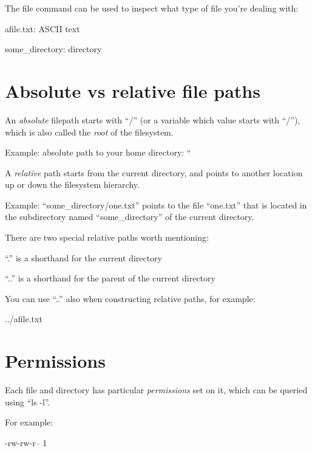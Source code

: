 The file command can be used to inspect what type of file you're dealing with:

\begin{prompt}
afile.txt: ASCII text

some_directory: directory
\end{prompt}

\section{Absolute vs relative file paths}

An \emph{absolute} filepath starts with ``/'' (or a variable which value starts
with ``/''), which is also called the \emph{root} of the filesystem.

Example: absolute path to your home directory:
``%

A \emph{relative} path starts from the current directory, and points to another
location up or down the filesystem hierarchy.

Example: ``some\_directory/one.txt'' points to the file ``one.txt'' that is
located in the subdirectory named ``some\_directory'' of the current directory.

There are two special relative paths worth mentioning:

\item ``.'' is a shorthand for the current directory
\item ``..'' is a shorthand for the parent of the current directory

You can use ``..'' also when constructing relative paths, for example:

\begin{prompt}
../afile.txt
\end{prompt}

\section{Permissions}

Each file and directory has particular \emph{permissions} set on it, which can be queried using ``ls -l''.

For example:

\begin{prompt}
-rw-rw-r-- 1 %
\end{prompt}

